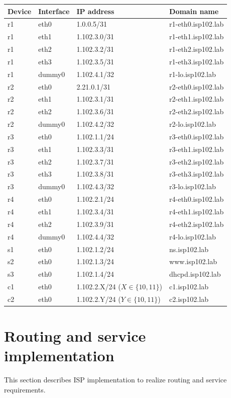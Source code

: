 \documentclass{article}
\begin{document}
\begin{center}
\begin{tabular}{ |l|l|l|l| } 
\hline
\textbf{Device} & \textbf{Interface} & \textbf{IP address} & \textbf{Domain name} \\
\hline
r1 & eth0 & 1.0.0.5/31 & r1-eth0.isp102.lab \\ 
r1 & eth1 & 1.102.3.0/31 & r1-eth1.isp102.lab \\ 
r1 & eth2 & 1.102.3.2/31 & r1-eth2.isp102.lab \\ 
r1 & eth3 & 1.102.3.5/31 & r1-eth3.isp102.lab \\ 
r1 & dummy0 & 1.102.4.1/32 & r1-lo.isp102.lab \\ 
\hline
r2 & eth0 & 2.21.0.1/31 & r2-eth0.isp102.lab \\ 
r2 & eth1 & 1.102.3.1/31 & r2-eth1.isp102.lab \\ 
r2 & eth2 & 1.102.3.6/31 & r2-eth2.isp102.lab \\ 
r2 & dummy0 & 1.102.4.2/32 & r2-lo.isp102.lab \\ 
\hline
r3 & eth0 & 1.102.1.1/24 & r3-eth0.isp102.lab \\ 
r3 & eth1 & 1.102.3.3/31 & r3-eth1.isp102.lab \\ 
r3 & eth2 & 1.102.3.7/31 & r3-eth2.isp102.lab \\ 
r3 & eth3 & 1.102.3.8/31 & r3-eth3.isp102.lab \\ 
r3 & dummy0 & 1.102.4.3/32 & r3-lo.isp102.lab \\ 
\hline
r4 & eth0 & 1.102.2.1/24 & r4-eth0.isp102.lab \\ 
r4 & eth1 & 1.102.3.4/31 & r4-eth1.isp102.lab \\ 
r4 & eth2 & 1.102.3.9/31 & r4-eth2.isp102.lab \\ 
r4 & dummy0 & 1.102.4.4/32 & r4-lo.isp102.lab \\ 
\hline
s1 & eth0 & 1.102.1.2/24 & ns.isp102.lab \\ 
s2 & eth0 & 1.102.1.3/24 & www.isp102.lab \\ 
s3 & eth0 & 1.102.1.4/24 & dhcpd.isp102.lab \\ 
\hline
c1 & eth0 & 1.102.2.X/24 ($X \in \{10,11\}$) & c1.isp102.lab \\ 
c2 & eth0 & 1.102.2.Y/24 ($Y \in \{10,11\}$) & c2.isp102.lab \\ 
\hline
\end{tabular}
\end{center}

\section{Routing and service implementation}
This section describes ISP implementation to realize routing and service requirements.
\end{document}

